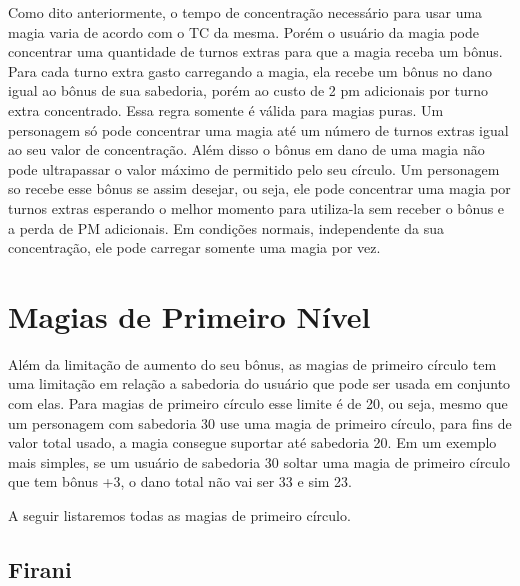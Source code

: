 Como dito anteriormente, o tempo de concentração necessário para usar uma magia varia de acordo com o TC da mesma. Porém o usuário da magia pode concentrar uma quantidade de turnos extras para que a magia receba um bônus. Para cada turno extra gasto carregando a magia, ela recebe um bônus no dano igual ao bônus de sua sabedoria, porém ao custo de 2 pm adicionais por turno extra concentrado. Essa regra somente é válida para magias puras. Um personagem só pode concentrar uma magia até um número de turnos extras igual ao seu valor de concentração. Além disso o bônus em dano de uma magia não pode ultrapassar o valor máximo de permitido pelo seu círculo. Um personagem so recebe esse bônus se assim desejar, ou seja, ele pode concentrar uma magia por turnos extras esperando o melhor momento para utiliza-la sem receber o bônus e a perda de PM adicionais. Em condições normais, independente da sua concentração, ele pode carregar somente uma magia por vez. 


\section{Magias de Primeiro Nível}

Além da limitação de aumento do seu bônus, as magias de primeiro círculo tem uma limitação em relação a sabedoria do usuário que pode ser usada em conjunto com elas. Para magias de primeiro círculo esse limite é de 20, ou seja, mesmo que um personagem com sabedoria 30 use uma magia de primeiro círculo, para fins de valor total usado, a magia consegue suportar até sabedoria 20. Em um exemplo mais simples, se um usuário de sabedoria 30 soltar uma magia de primeiro círculo que tem bônus +3, o dano total não vai ser 33 e sim 23.

A seguir listaremos todas as magias de primeiro círculo.

\subsection{Firani}


